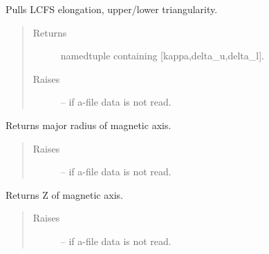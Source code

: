 \documentclass[letterpaper,10pt,english]{sphinxmanual}
\begin{document}
\begin{fulllineitems}
\begin{fulllineitems}
\end{fulllineitems}


\begin{fulllineitems}
\label{eqtools:eqtools.eqdskreader.EqdskReader.getShaping}
Pulls LCFS elongation, upper/lower triangularity.
\begin{quote}\begin{description}
\item[{Returns}] \leavevmode
namedtuple containing {[}kappa,delta\_u,delta\_l{]}.

\item[{Raises }] \leavevmode
{} -- 
if a-file data is not read.

\end{description}\end{quote}

\end{fulllineitems}


\begin{fulllineitems}
\label{eqtools:eqtools.eqdskreader.EqdskReader.getMagR}
Returns major radius of magnetic axis.
\begin{quote}\begin{description}
\item[{Raises }] \leavevmode
{} -- 
if a-file data is not read.

\end{description}\end{quote}

\end{fulllineitems}


\begin{fulllineitems}
\label{eqtools:eqtools.eqdskreader.EqdskReader.getMagZ}
Returns Z of magnetic axis.
\begin{quote}\begin{description}
\item[{Raises }] \leavevmode
{} -- 
if a-file data is not read.

\end{description}\end{quote}


\end{fulllineitems}
\end{fulllineitems}
\end{document}
